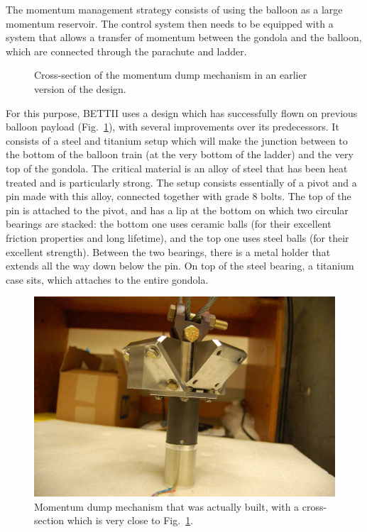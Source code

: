 The momentum management strategy consists of using the balloon as a large momentum reservoir. The control system then needs to be equipped with a system that allows a transfer of momentum between the gondola and the balloon, which are connected through the parachute and ladder. 

\begin{figure}[!h]
	\centering
	
	\caption[Momentum dump assembly]{Cross-section of the momentum dump mechanism in an earlier version of the design.}
	\label{fig:rotator}
    \end{figure}


For this purpose, BETTII uses a design which has successfully flown on previous balloon payload (Fig.~\ref{fig:rotator}), with several improvements over its predecessors. It consists of a steel and titanium setup which will make the junction between to the bottom of the balloon train (at the very bottom of the ladder) and the very top of the gondola. The critical material is an alloy of steel that has been heat treated and is particularly strong. The setup consists essentially of a pivot and a pin made with this alloy, connected together with grade 8 bolts. The top of the pin is attached to the pivot, and has a lip at the bottom on which two circular bearings are stacked: the bottom one uses ceramic balls (for their excellent friction properties and long lifetime), and the top one uses steel balls (for their excellent strength). Between the two bearings, there is a metal holder that extends all the way down below the pin. On top of the steel bearing, a titanium case sits, which attaches to the entire gondola. 

\begin{figure}[!h]
		\centering
		\includegraphics[width=\textwidth]{Figures/MomDump.jpg} 
		\caption[Momentum dump mechanism and pin]{Momentum dump mechanism that was actually built, with a cross-section which is very close to Fig.~\ref{fig:rotator}.}
		\label{fig:MomDump}
\end{figure}

